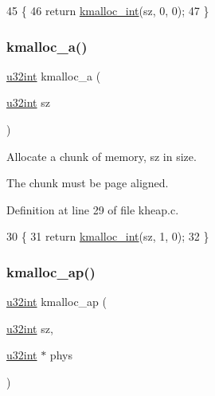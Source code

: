 \begin{DoxyCode}
45 \{
46     \textcolor{keywordflow}{return} \hyperlink{a00062_a8b976e8a7e805ef85fcfa68b9b9bbd63_a8b976e8a7e805ef85fcfa68b9b9bbd63}{kmalloc\_int}(sz, 0, 0);
47 \}
\end{DoxyCode}
\mbox{\label{a00065_a2f7fc26d2604f7bd8bd6d4fac5c98f16_a2f7fc26d2604f7bd8bd6d4fac5c98f16}} 
\subsubsection{\texorpdfstring{kmalloc\+\_\+a()}{kmalloc\_a()}}
{\footnotesize\ttfamily \hyperlink{a00116_a7ae3a26c17ddfe117c6291739780801d_a7ae3a26c17ddfe117c6291739780801d}{u32int} kmalloc\+\_\+a (\begin{DoxyParamCaption}\item[{\hyperlink{a00116_a7ae3a26c17ddfe117c6291739780801d_a7ae3a26c17ddfe117c6291739780801d}{u32int}}]{sz }\end{DoxyParamCaption})}



Allocate a chunk of memory, sz in size. 

The chunk must be page aligned. 

Definition at line 29 of file kheap.\+c.


\begin{DoxyCode}
30 \{
31     \textcolor{keywordflow}{return} \hyperlink{a00062_a8b976e8a7e805ef85fcfa68b9b9bbd63_a8b976e8a7e805ef85fcfa68b9b9bbd63}{kmalloc\_int}(sz, 1, 0);
32 \}
\end{DoxyCode}
\mbox{\label{a00065_ab4fd209369f6c18acead48b80e7f09c7_ab4fd209369f6c18acead48b80e7f09c7}} 
\subsubsection{\texorpdfstring{kmalloc\+\_\+ap()}{kmalloc\_ap()}}
{\footnotesize\ttfamily \hyperlink{a00116_a7ae3a26c17ddfe117c6291739780801d_a7ae3a26c17ddfe117c6291739780801d}{u32int} kmalloc\+\_\+ap (\begin{DoxyParamCaption}\item[{\hyperlink{a00116_a7ae3a26c17ddfe117c6291739780801d_a7ae3a26c17ddfe117c6291739780801d}{u32int}}]{sz,  }\item[{\hyperlink{a00116_a7ae3a26c17ddfe117c6291739780801d_a7ae3a26c17ddfe117c6291739780801d}{u32int} $\ast$}]{phys }\end{DoxyParamCaption})}



